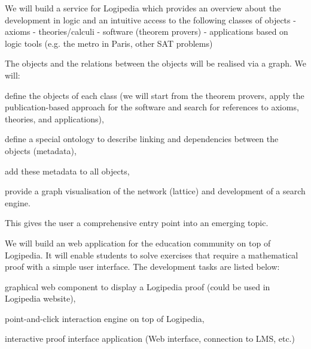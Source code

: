 \begin{workpackage}[id=dissemination,type=MGT,wphases=1-48,
  short={Dissemination},
  title={Dissemination, communication and exploitation},
  lead=Lie,LieRM=3,InrRM=6,BirRM=4,CleRM=2,ImtRM=2,StrRM=2,ZibRM=14,EduRM=12]
\begin{tasklist}
  \begin{task}[id=zib,
      title=Linking scientific publications to Logipedia,
      shorttitle=Pub. link,
      lead=Zib,ZibRM=12,wphases=12-24]
    We will build a service for Logipedia which provides an overview
    about the development in logic and an intuitive access to the
    following classes of objects - axioms - theories/calculi -
    software (theorem provers) - applications based on logic tools
    (e.g. the metro in Paris, other SAT problems)

    The objects and the relations between the objects will be
    realised via a graph. We will:
    \begin{compactitem}
    \item define the objects of each class (we will start from the
      theorem provers, apply the publication-based approach for the
      software and search for references to axioms, theories, and
      applications),
    \item define a special ontology to describe linking and
      dependencies between the objects (metadata),
    \item add these metadata to all objects,
    \item provide a graph visualisation of the network (lattice) and development
      of a search engine.
    \end{compactitem}
    This gives the user a comprehensive entry point into an emerging
    topic.
  \end{task}

  \begin{task}[id=edukera,
      title=Web teaching interface for doing proofs at school,
      shorttitle=Teach.,
      lead=Edu,EduRM=12,wphases=19-30]
    We will build an web application for the education community on top of Logipedia. It will enable students to solve exercises that require
    a mathematical proof with a simple user interface.
    The development tasks are listed below:
    \begin{compactitem}
    \item graphical web component to display a Logipedia proof (could be used in Logipedia website), 
    \item point-and-click interaction engine on top of Logipedia,
    \item interactive proof interface application (Web interface, connection to LMS, etc.)
    \end{compactitem}
  \end{task}
  

\end{tasklist}
\end{workpackage}
